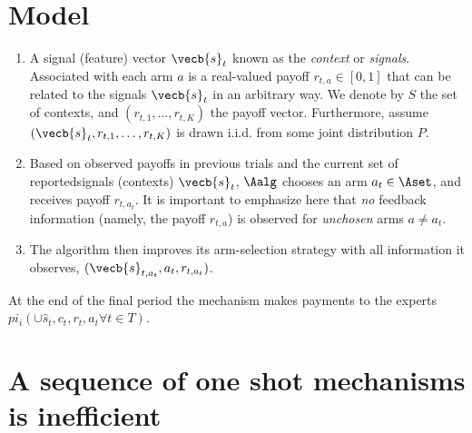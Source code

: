 \section{Model}


\begin{enumerate}

\item{A signal (feature) vector $\vecb{s}_{t}$ known as the
   \emph{context} or \emph{signals}.  Associated with each arm $a$ is a real-valued
   payoff $r_{t,a}\in[0,1]$ that can be related to the signals
   $\vecb{s}_{t}$ in an arbitrary way.  We denote by $S$ the set of
   contexts, and $(r_{t,1},\ldots,r_{t,K})$ the payoff vector.  
   Furthermore, assume $(\vecb{s}_t,r_{t,1},\ldots,r_{t,K})$ is drawn i.i.d. from some joint
   distribution $P$.} 
 \item{Based on observed payoffs in previous trials and the current set of reportedsignals (contexts) $\vecb{s}_t$, $\Aalg$ chooses an arm $a_t\in\Aset$, and receives payoff $r_{t,a_t}$.  It is important to emphasize here that \emph{no} feedback information (namely, the payoff $r_{t,a}$) is observed for \emph{unchosen} arms $a \ne a_t$.}
\item{The algorithm then improves its arm-selection strategy with all information it observes, $(\vecb{s}_{t,a_t},a_t,r_{t,a_t})$.} \label{def:bandit-feedback}
 \end{enumerate}




At the end of the final period the mechanism makes payments to the experts $pi_i( \cup \hat{s}_t,c_t,r_t,a_t \forall t \in T)$.


\section{A sequence of one shot mechanisms is inefficient}


